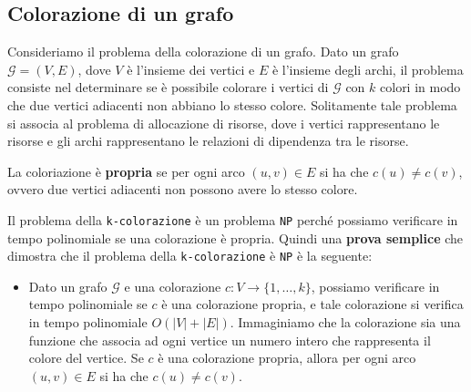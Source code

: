 \subsection{Colorazione di un grafo}
Consideriamo il problema della colorazione di un grafo. Dato un grafo $\mathcal{G} = (V, E)$,
dove $V$ è l'insieme dei vertici e $E$ è l'insieme degli archi, il problema consiste
nel determinare se è possibile colorare i vertici di $\mathcal{G}$ con $k$ colori in modo che
due vertici adiacenti non abbiano lo stesso colore. Solitamente tale problema si associa 
al problema di allocazione di risorse, dove i vertici rappresentano le risorse e gli archi
rappresentano le relazioni di dipendenza tra le risorse.

\begin{tcolorbox}
    La coloriazione è \textbf{propria} se per ogni arco $(u, v) \in E$ si ha che
    $c(u) \neq c(v)$, ovvero due vertici adiacenti non possono avere lo stesso colore.
\end{tcolorbox}
Il problema della \texttt{k-colorazione} è un problema \texttt{NP} perché possiamo
verificare in tempo polinomiale se una colorazione è propria. Quindi una \textbf{prova semplice} 
che dimostra che il problema della \texttt{k-colorazione} è \texttt{NP} è la seguente:
\begin{itemize}
    \item Dato un grafo $\mathcal{G}$ e una colorazione $c: V \rightarrow \{1, \ldots, k\}$,
    possiamo verificare in tempo polinomiale se $c$ è una colorazione propria, e tale 
    colorazione si verifica in tempo polinomiale $O(|V| + |E|)$.
    Immaginiamo che la colorazione sia una funzione che associa ad ogni vertice un numero 
    intero che rappresenta il colore del vertice. Se $c$ è una colorazione propria, allora
    per ogni arco $(u, v) \in E$ si ha che $c(u) \neq c(v)$.
\end{itemize}

